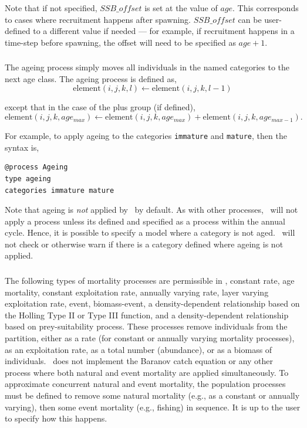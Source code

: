 Note that if not specified, $SSB\_offset$ is set at the value of $age$. This corresponds to cases where recruitment happens after spawning. $SSB\_offset$ can be user-defined to a different value if needed --- for example, if recruitment happens in a time-step before spawning, the offset will need to be specified as $age + 1$.

\subsubsection{\label{sec:ageing}}

The ageing process simply moves all individuals in the named categories to the next age class. The ageing process is defined as,
\begin{equation}
  \text{element}(i,j,k,l) \leftarrow \text{element}(i,j,k,l-1)
\end{equation}

except that in the case of the plus group (if defined), 
\begin{equation}
  \text{element}(i,j,k,age_{max}) \leftarrow \text{element}(i,j,k,age_{max}) + \text{element}(i,j,k,age_{max-1}).
\end{equation}

For example, to apply ageing to the categories \texttt{immature} and \texttt{mature}, then the syntax is,
{\small{\begin{verbatim}
@process Ageing
type ageing
categories immature mature
\end{verbatim}}}

Note that ageing is \emph{not} applied by \SPM\ by default. As with other processes, \SPM\ will not apply a process unless its defined and specified as a process within the annual cycle. Hence, it is possible to specify a model where a category is not aged. \SPM\ will not check or otherwise warn if there is a category defined where ageing is not applied.

\subsubsection{\label{sec:mortality}}

The following types of mortality processes are permissible in \SPM, constant rate, age mortality, constant exploitation rate, annually varying rate, layer varying exploitation rate, event, biomass-event, a density-dependent relationship based on the Holling \citep{Holling1959} Type II or Type III function, and a density-dependent relationship based on prey-suitability process. These processes remove individuals from the partition, either as a rate (for constant or annually varying mortality processes), as an exploitation rate, as a total number (abundance), or as a biomass of individuals. \SPM\ does not implement the Baranov catch equation or any other process where both natural and event mortality are applied simultaneously. To approximate concurrent natural and event mortality, the population processes must be defined to remove some natural mortality (e.g., as a constant or annually varying), then some event mortality (e.g., fishing) in sequence. It is up to the user to specify how this happens.

